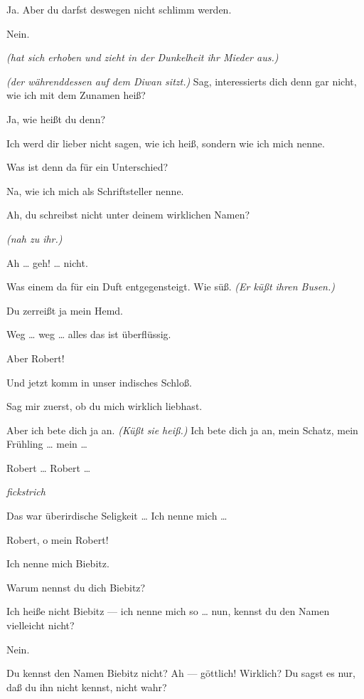 \documentclass[
	final,
	a4paper,
	ngerman,
	mpinclude = true, %
	twoside = true,
	open = right,
	cleardoublepage = plain,
	DIV = 13,
	BCOR = 1cm,
	titlepage = firstiscover,
	]{scrbook}
\newcommand{\direction}[1]{\textit{(#1)}}
\newcommand{\hiat}{%
	\begin{center}
		\tiny
		\raisebox{0.5ex}{\rule{0.3\linewidth}{0.4pt}}
		\textit{fickstrich}
		\raisebox{0.5ex}{\rule{0.3\linewidth}{0.4pt}}
	\end{center}
}
\newcommand{\thecharacter}[1]{\textup{\textsc{#1}}\xspace}
\newcommand{\thesuesse}{\thecharacter{Süßes Mädel}}
\newcommand{\thedichter}{\thecharacter{Dichter}}
\newcommand{\character}[1]{\item[#1:]}
\newcommand{\suesse}{\character{\thesuesse}}
\newcommand{\dichter}{\character{\thedichter}}
\begin{document}
\begin{play}
	\suesse
	Ja. Aber du darfst deswegen nicht schlimm werden.

	\dichter
	Nein.

	\suesse
	\direction{hat sich erhoben und zieht in der Dunkelheit ihr Mieder aus.}

	\dichter
	\direction{der währenddessen auf dem Diwan sitzt.} Sag, interessierts dich denn gar nicht, wie ich mit dem Zunamen heiß?

	\suesse
	Ja, wie heißt du denn?

	\dichter
	Ich werd dir lieber nicht sagen, wie ich heiß, sondern wie ich mich nenne.

	\suesse
	Was ist denn da für ein Unterschied?

	\dichter
	Na, wie ich mich als Schriftsteller nenne.

	\suesse
	Ah, du schreibst nicht unter deinem wirklichen Namen?

	\dichter
	\direction{nah zu ihr.}

	\suesse
	Ah \ldots{} geh! \ldots{} nicht.

	\dichter
	Was einem da für ein Duft entgegensteigt. Wie süß. \direction{Er küßt ihren Busen.}

	\suesse
	Du zerreißt ja mein Hemd.

	\dichter
	Weg \ldots{} weg \ldots{} alles das ist überflüssig.

	\suesse
	Aber Robert!

	\dichter
	Und jetzt komm in unser indisches Schloß.

	\suesse
	Sag mir zuerst, ob du mich wirklich liebhast.

	\dichter
	Aber ich bete dich ja an. \direction{Küßt sie heiß.} Ich bete dich ja an, mein Schatz, mein Frühling \ldots{} mein \ldots{}

	\suesse
	Robert \ldots{} Robert \ldots{}

	\hiat

	\dichter
	Das war überirdische Seligkeit \ldots{} Ich nenne mich \ldots{}

	\suesse
	Robert, o mein Robert!

	\dichter
	Ich nenne mich Biebitz.

	\suesse
	Warum nennst du dich Biebitz?

	\dichter
	Ich heiße nicht Biebitz --- ich nenne mich so \ldots{} nun, kennst du den Namen vielleicht nicht?

	\suesse
	Nein.

	\dichter
	Du kennst den Namen Biebitz nicht? Ah --- göttlich! Wirklich? Du sagst es nur, daß du ihn nicht kennst, nicht wahr?


\end{play}
\end{document}
